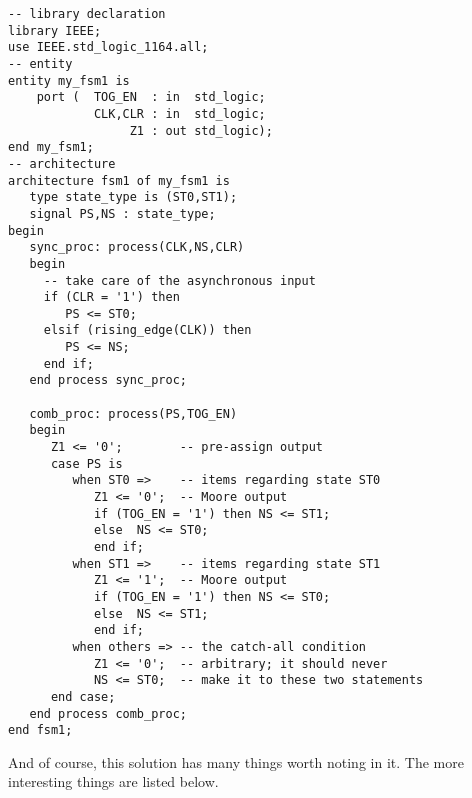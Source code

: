 \noindent
\begin{minipage}{0.99\linewidth}
\begin{lstlisting}[label=exe_18_code, caption=Solution to Example~18.]
-- library declaration
library IEEE;
use IEEE.std_logic_1164.all;
-- entity
entity my_fsm1 is 
    port (  TOG_EN  : in  std_logic; 
            CLK,CLR : in  std_logic; 
                 Z1 : out std_logic); 
end my_fsm1;
-- architecture
architecture fsm1 of my_fsm1 is
   type state_type is (ST0,ST1); 
   signal PS,NS : state_type; 
begin
   sync_proc: process(CLK,NS,CLR)
   begin
     -- take care of the asynchronous input
     if (CLR = '1') then 
        PS <= ST0;  
     elsif (rising_edge(CLK)) then 
        PS <= NS; 
     end if; 
   end process sync_proc; 

   comb_proc: process(PS,TOG_EN)
   begin
      Z1 <= '0';        -- pre-assign output
      case PS is 
         when ST0 =>    -- items regarding state ST0
            Z1 <= '0';  -- Moore output
            if (TOG_EN = '1') then NS <= ST1; 
            else  NS <= ST0; 
            end if; 
         when ST1 =>    -- items regarding state ST1
            Z1 <= '1';  -- Moore output
            if (TOG_EN = '1') then NS <= ST0; 
            else  NS <= ST1; 
            end if; 
         when others => -- the catch-all condition
            Z1 <= '0';  -- arbitrary; it should never 
            NS <= ST0;  -- make it to these two statements
      end case; 
   end process comb_proc; 
end fsm1;
\end{lstlisting}
\end{minipage}

And of course, this solution has many things worth noting in it. The more interesting things are listed below. 

